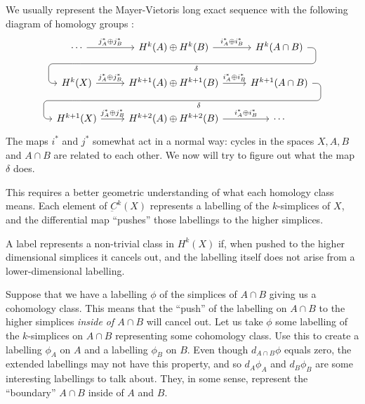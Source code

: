 We usually represent the Mayer-Vietoris long exact sequence with the following diagram of homology groups :
\[\begin{tikzcd}
	\cdots         \arrow{r}{j^*_A\oplus j^*_B} \arrow[draw=none]{d}[name=Z, shape=coordinate]{}&H^{k  }(A)\oplus H^{k  }(B) \arrow{r}{i^*_A\oplus i^*_B} & H^{k  }(A\cap B) \arrow[rounded corners,to path={ -- ([xshift=2ex]\tikztostart.east)|- (Z) [near end]\tikztonodes-| ([xshift=-2ex]\tikztotarget.west)-- (\tikztotarget)}]{dll}{\delta} \\
	H^{k  }(X)     \arrow{r}{j^*_A\oplus j^*_B} \arrow[draw=none]{d}[name=Z, shape=coordinate]{}&H^{k+1}(A)\oplus H^{k+1}(B) \arrow{r}{i^*_A\oplus i^*_B} & H^{k+1}(A\cap B) \arrow[rounded corners,to path={ -- ([xshift=2ex]\tikztostart.east)|- (Z) [near end]\tikztonodes-| ([xshift=-2ex]\tikztotarget.west)-- (\tikztotarget)}]{dll}{\delta} \\
	H^{k+1}(X)     \arrow{r}{j^*_A\oplus j^*_B} &                                                H^{k+2}(A)\oplus H^{k+2}(B) \arrow{r}{i^*_A\oplus i^*_B} &\cdots 
\end{tikzcd}
\]
The maps $i^*$ and $j^*$ somewhat act in a normal way: cycles in the spaces $X, A, B$ and $A\cap B$ are related to each other. We now will try to figure out what the map $\delta$ does.

This requires a better geometric understanding of what each homology class means. Each element of $\underbar C^k(X)$ represents a labelling of the $k$-simplices of $X$, and the differential map ``pushes'' those labellings to the higher simplices. 

A label represents a non-trivial class in $H^k(X)$ if, when pushed to the higher dimensional simplices it cancels out, and the labelling itself does not arise from a lower-dimensional labelling. 

Suppose that we have a labelling $\phi$ of the simplices of $A\cap B$ giving us a cohomology class. This means that the ``push'' of the labelling on $A\cap B$ to the higher simplices \emph{inside of $A\cap B$} will cancel out.
Let us take $\phi$ some labelling of the $k$-simplices  on $A\cap B$ representing some cohomology class. Use this to create a labelling $\phi_A$ on $A$ and a labelling $\phi_B$ on $B$.
 Even though $d_{A\cap B}\phi$  equals zero, the extended labellings may not have this property, and so $d_A\phi_A$ and $d_B\phi_B$ are some interesting labellings to talk about. They, in some sense, represent the ``boundary'' $A\cap B$ inside of $A$ and $B$. 

